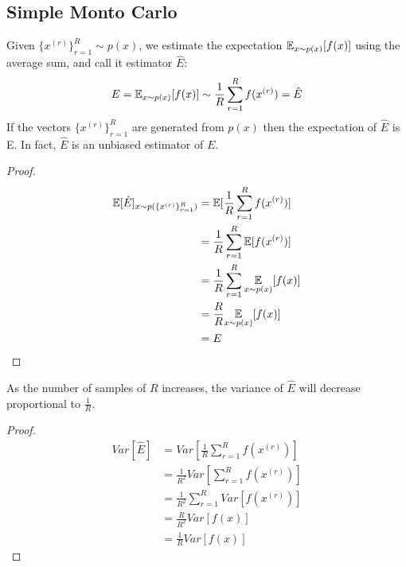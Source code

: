 \documentclass[11pt]{article}
\begin{document}
\subsection{Simple Monto Carlo}
Given $\{x^{(r)}\}_{r=1}^R \sim p(x)$, we estimate the expectation $\mathbb{E}_{x\sim p(x)}[f(x)]$ using the average sum, and call it estimator $\hat{E}$:
$$E = \mathbb{E}_{x\sim p(x)}[f(x)] \sim \frac{1}{R}\sum_{r=1}^R f(x^{(r)}) = \hat{E}$$
\property
If the vectors $\{x^{(r)}\}_{r=1}^R$ are generated from $p(x)$ then the expectation of $\hat{E}$ is E. In fact, $\hat{E}$ is an unbiased estimator of $E$.
\begin{proof}
\begin{align*}
	\mathbb{E}[{\hat{E}}]_{x\sim p(\{x^{(r)}\}_{r=1}^R)} &= \mathbb{E}[{\frac{1}{R}\sum_{r=1}^R f(x^{(r)})}]\\
	&= \frac{1}{R}\sum_{r=1}^R \mathbb{E}[{f(x^{(r)})}] \\
	&= \frac{1}{R} \sum_{r=1}^R \underset{x \sim p(x)}{\mathbb{E}}[f(x)]\\
	&= \frac{R}{R}  \underset{x \sim p(x)}{\mathbb{E}}[f(x)]\\
	&= E
\end{align*}
\end{proof}
\property
As the number of samples of $R$ increases, the variance of $\hat{E}$ will decrease proportional to $\frac{1}{R}$.
\begin{proof}
	\begin{align*}
		Var[\hat{E}] &= Var\left[\frac{1}{R} \sum_{r=1}^R f(x^{(r)})\right] \\
		&= \frac{1}{R^2}Var\left[\sum_{r=1}^R f(x^{(r)})\right]\\
		&= \frac{1}{R^2}\sum_{r=1}^R Var\left[ f(x^{(r)}) \right] \tag{by i.i.d. assumption}\\
		&= \frac{R}{R^2} Var[f(x)] \\
		&= \frac{1}{R} Var[f(x)]
	\end{align*}
\end{proof} 
\end{document}
